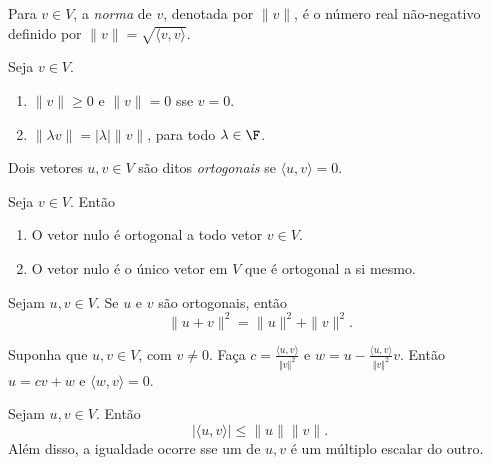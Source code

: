 \documentclass{article}
\begin{document}
\begin{defn}
    Para \(v \in V\), a \emph{norma} de \(v\), denotada por \(\|v\|\), é o número real não-negativo definido por \(\|v\| = \sqrt{\langle v, v \rangle}\).
\end{defn}

\begin{prop} 
    Seja \(v \in V\).
    \begin{enumerate}
        \item [(a)] \(\|v\| \geq 0\) e \(\|v\| = 0\) sse \(v = 0\).
        \item [(b)] \(\|\lambda v\| = |\lambda| \|v\|\), para todo \(\lambda \in \F\).
    \end{enumerate}
\end{prop}

\begin{defn}
    Dois vetores \(u, v \in V\) são ditos \emph{ortogonais} se \(\langle u, v \rangle = 0\).
\end{defn}

\begin{prop} Seja \(v \in V\). Então
    \begin{enumerate}
        \item [(a)] O vetor nulo é ortogonal a todo vetor \(v \in V\).
        \item [(b)] O vetor nulo é o único vetor em \(V\) que é ortogonal a si mesmo.
    \end{enumerate}
\end{prop}

\begin{thm} 
    Sejam \(u, v \in V\). Se \(u\) e \(v\) são ortogonais, então
    \[
        \|u + v\|^2 = \|u\|^2 + \|v\|^2.
    \]
\end{thm}

\begin{prop} 
    Suponha que \(u, v \in V\), com \(v\neq0\). Faça \(\displaystyle c=\frac{\langle u,v \rangle}{\Vert v \Vert^2}\) e \(\displaystyle w = u - \frac{\langle u,v \rangle}{\Vert v \Vert^2} v\). Então \(u = cv + w\) e \(\langle w, v \rangle = 0\).
\end{prop}

\begin{thm} 
    Sejam \(u, v \in V\). Então
    \begin{equation}
        |\langle u, v \rangle| \leq \|u\| \|v\|.
    \end{equation}
    \noindent Além disso, a igualdade ocorre sse um de \(u, v\) é um múltiplo escalar do outro.
\end{thm}
\end{document}
